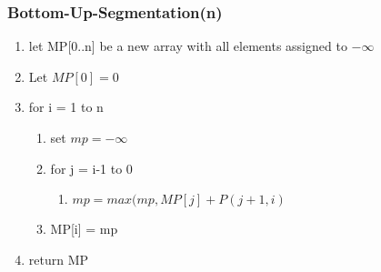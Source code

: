 \documentclass[10pt,a4paper]{article}
\begin{document}
\subsubsection*{Bottom-Up-Segmentation(n)}
\begin{enumerate}
\item let MP[0..n] be a new array with all elements assigned to $-\infty$
\item Let $MP[0]=0$
\item for i = 1 to n
\begin{enumerate}
\item set $mp = -\infty$
\item for j = i-1 to 0
\begin{enumerate}
\item $mp = max(mp, MP[j] + P(j+1, i)$
\end{enumerate}
\item MP[i] = mp
\end{enumerate}
\item return MP
\end{enumerate}
\end{document}
